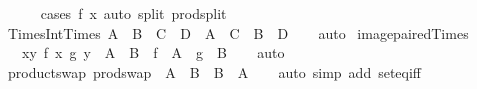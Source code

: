 \begin{isabellebody}
\ \ \ \ \isamarkupfalse%
\ {\isacharparenleft}{\kern0pt}cases\ {\isachardoublequoteopen}f\ x{\isachardoublequoteclose}{\isacharparenright}{\kern0pt}\ {\isacharparenleft}{\kern0pt}auto\ split{\isacharcolon}{\kern0pt}\ prod{\isachardot}{\kern0pt}split{\isacharparenright}{\kern0pt}\isanewline
{}\isamarkupfalse%
%
\endisatagproof
{\isafoldproof}%
%
\isadelimproof
\isanewline
%
\endisadelimproof
\isanewline
{}\isamarkupfalse%
\ Times{\isacharunderscore}{\kern0pt}Int{\isacharunderscore}{\kern0pt}Times{\isacharcolon}{\kern0pt}\ {\isachardoublequoteopen}A\ {\isasymtimes}\ B\ {\isasyminter}\ C\ {\isasymtimes}\ D\ {\isacharequal}{\kern0pt}\ {\isacharparenleft}{\kern0pt}A\ {\isasyminter}\ C{\isacharparenright}{\kern0pt}\ {\isasymtimes}\ {\isacharparenleft}{\kern0pt}B\ {\isasyminter}\ D{\isacharparenright}{\kern0pt}{\isachardoublequoteclose}\isanewline
%
\isadelimproof
\ \ %
\endisadelimproof
%
\isatagproof
{}\isamarkupfalse%
\ auto%
\endisatagproof
{\isafoldproof}%
%
\isadelimproof
\isanewline
%
\endisadelimproof
\isanewline
{}\isamarkupfalse%
\ image{\isacharunderscore}{\kern0pt}paired{\isacharunderscore}{\kern0pt}Times{\isacharcolon}{\kern0pt}\isanewline
\ \ \ {\isachardoublequoteopen}{\isacharparenleft}{\kern0pt}{\isasymlambda}{\isacharparenleft}{\kern0pt}x{\isacharcomma}{\kern0pt}y{\isacharparenright}{\kern0pt}{\isachardot}{\kern0pt}\ {\isacharparenleft}{\kern0pt}f\ x{\isacharcomma}{\kern0pt}\ g\ y{\isacharparenright}{\kern0pt}{\isacharparenright}{\kern0pt}\ {\isacharbackquote}{\kern0pt}\ {\isacharparenleft}{\kern0pt}A\ {\isasymtimes}\ B{\isacharparenright}{\kern0pt}\ {\isacharequal}{\kern0pt}\ {\isacharparenleft}{\kern0pt}f\ {\isacharbackquote}{\kern0pt}\ A{\isacharparenright}{\kern0pt}\ {\isasymtimes}\ {\isacharparenleft}{\kern0pt}g\ {\isacharbackquote}{\kern0pt}\ B{\isacharparenright}{\kern0pt}{\isachardoublequoteclose}\isanewline
%
\isadelimproof
\ \ %
\endisadelimproof
%
\isatagproof
{}\isamarkupfalse%
\ auto%
\endisatagproof
{\isafoldproof}%
%
\isadelimproof
\isanewline
%
\endisadelimproof
\isanewline
{}\isamarkupfalse%
\ product{\isacharunderscore}{\kern0pt}swap{\isacharcolon}{\kern0pt}\ {\isachardoublequoteopen}prod{\isachardot}{\kern0pt}swap\ {\isacharbackquote}{\kern0pt}\ {\isacharparenleft}{\kern0pt}A\ {\isasymtimes}\ B{\isacharparenright}{\kern0pt}\ {\isacharequal}{\kern0pt}\ B\ {\isasymtimes}\ A{\isachardoublequoteclose}\isanewline
%
\isadelimproof
\ \ %
\endisadelimproof
%
\isatagproof
{}\isamarkupfalse%
\ {\isacharparenleft}{\kern0pt}auto\ simp\ add{\isacharcolon}{\kern0pt}\ set{\isacharunderscore}{\kern0pt}eq{\isacharunderscore}{\kern0pt}iff{\isacharparenright}{\kern0pt}%

\end{isabellebody}
